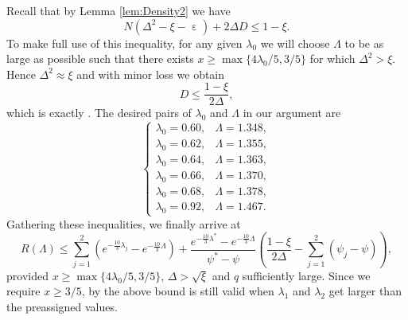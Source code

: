 \documentclass[10pt, reqno]{amsart}
\numberwithin{equation}{section}
\newcommand{\bb}[1]{\left(#1\right)}
\renewcommand{\epsilon }{\operatorname{\varepsilon}}
\begin{document}
Recall that by Lemma \ref{lem:Density2} we have
\begin{equation}\label{eq:Inequality}
N (\Delta^2-\xi-\epsilon)+ 2\Delta D \leq 1-\xi.
\end{equation}
To make full use of this inequality, for any given $\lambda_0$ we will choose $\Lambda$ to be as large as possible such that there exists $x\geq \max \{4\lambda_0/5, 3/5\}$ for which $\Delta^2>\xi$. Hence $\Delta^2\approx \xi$ and with minor loss we obtain
\begin{equation}\label{eq:DBound}
D\leq \frac{1-\xi}{2\Delta},
\end{equation}
which is exactly \cite[Theorem J]{Pintz2018}. The desired pairs of $\lambda_0$ and $\Lambda$ in our argument are
\begin{equation}\label{eq:Pairs}
\begin{cases}
\lambda_0=0.60,&\Lambda=1.348, \\
\lambda_0=0.62,& \Lambda= 1.355, \\
\lambda_0=0.64,& \Lambda= 1.363, \\
\lambda_0=0.66,& \Lambda= 1.370, \\
\lambda_0=0.68,& \Lambda= 1.378, \\
\lambda_0=0.92,& \Lambda= 1.467.
\end{cases}
\end{equation}
Gathering these inequalities, we finally arrive at
\begin{equation}\label{eq:RFinal}
R(\Lambda)\leq \sum_{j=1}^2(e^{-\frac{10}{3}\lambda_{j}}-e^{-\frac{10}{3}\Lambda})+\frac{e^{-\frac{10}{3}\lambda^*}-e^{-\frac{10}{3}\Lambda}}{\psi^*-\psi} \bb{\frac{1-\xi}{2\Delta}-\sum_{j=1}^2(\psi_j-\psi)},
\end{equation}
provided $x\geq \max\{4\lambda_0/5,3/5\}$, $\Delta>\sqrt{\xi}$ and $q$ sufficiently large. Since we require $x\geq 3/5$, by \cite[Theorem K]{Pintz2018} the above bound is still valid when $\lambda_1$ and $\lambda_2$ get larger than the preassigned values.
\end{document}
